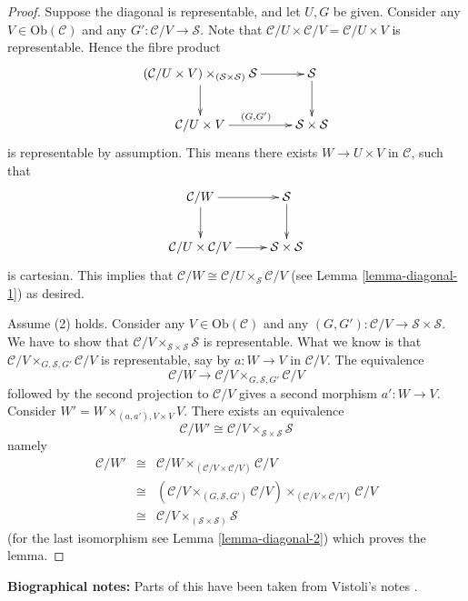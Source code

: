 \begin{proof}
Suppose the diagonal is representable, and let $U, G$ be given.
Consider any $V \in \text{Ob}(\mathcal{C})$ and any
$G' : \mathcal{C}/V \to \mathcal{S}$.
Note that $\mathcal{C}/U \times \mathcal{C}/V = \mathcal{C}/U \times V$
is representable. Hence the fibre product
$$
\xymatrix{
(\mathcal{C}/U \times V)
\times_{(\mathcal{S} \times \mathcal{S})}
\mathcal{S}
\ar[r] \ar[d] &
\mathcal{S} \ar[d] \\
\mathcal{C}/U \times V \ar[r]^{(G, G')} &
\mathcal{S} \times \mathcal{S}
}
$$
is representable by assumption.
This means there exists $W \to U \times V$ in $\mathcal{C}$,
such that
$$
\xymatrix{
\mathcal{C}/W \ar[d] \ar[r] & \mathcal{S} \ar[d] \\
\mathcal{C}/U \times \mathcal{C}/V \ar[r] & \mathcal{S} \times \mathcal{S}
}
$$
is cartesian. This implies that
$\mathcal{C}/W \cong \mathcal{C}/U \times_{\mathcal{S}} \mathcal{C}/V$
(see Lemma \ref{lemma-diagonal-1})
as desired.

\medskip\noindent
Assume (2) holds. Consider any $V \in \text{Ob}(\mathcal{C})$
and any $(G, G') : \mathcal{C}/V \to \mathcal{S} \times \mathcal{S}$.
We have to show that
$\mathcal{C}/V \times_{\mathcal{S} \times \mathcal{S}} \mathcal{S}$
is representable. What we know is that
$\mathcal{C}/V \times_{G, \mathcal{S}, G'} \mathcal{C}/V$
is representable, say by $a : W \to V$ in $\mathcal{C}/V$.
The equivalence
$$
\mathcal{C}/W \to \mathcal{C}/V \times_{G, \mathcal{S}, G'} \mathcal{C}/V
$$
followed by the second projection to $\mathcal{C}/V$ gives a
second morphism $a' : W \to V$. Consider
$W' = W \times_{(a, a'), V\times V} V$.
There exists an equivalence
$$
\mathcal{C}/W' \cong
\mathcal{C}/V \times_{\mathcal{S} \times \mathcal{S}} \mathcal{S}
$$
namely
\begin{eqnarray*}
\mathcal{C}/W' & \cong &
\mathcal{C}/W \times_{(\mathcal{C}/V \times \mathcal{C}/V)} \mathcal{C}/V \\
& \cong &
\left(\mathcal{C}/V \times_{(G, \mathcal{S}, G')} \mathcal{C}/V\right)
\times_{(\mathcal{C}/V \times \mathcal{C}/V)} \mathcal{C}/V \\
& \cong &
\mathcal{C}/V \times_{(\mathcal{S} \times \mathcal{S})} \mathcal{S}
\end{eqnarray*}
(for the last isomorphism see Lemma \ref{lemma-diagonal-2})
which proves the lemma.
\end{proof}















\medskip\noindent
{\bf Biographical notes:}
Parts of this have been taken from Vistoli's notes \cite{Vis2}.







